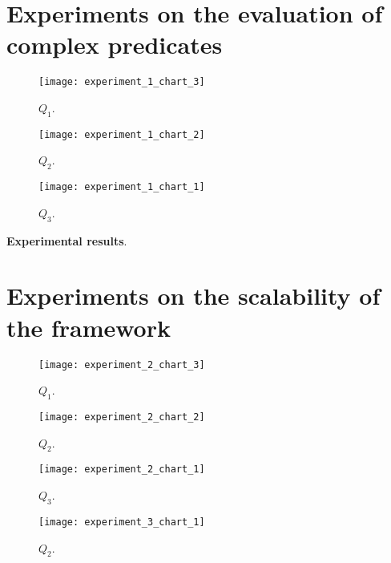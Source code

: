

\section{Experiments on the evaluation of complex predicates}\label{sec:predicates}


\begin{figure}[H]
  \centering
  \texttt{[image: experiment\_1\_chart\_3]}
  \caption{$Q_{1}$.}
  \label{fig:???}
\end{figure}

\begin{figure}[H]
  \centering
  \texttt{[image: experiment\_1\_chart\_2]}
  \caption{$Q_{2}$.}
  \label{fig:???}
\end{figure}

\begin{figure}[H]
  \centering
  \texttt{[image: experiment\_1\_chart\_1]}
  \caption{$Q_{3}$.}
  \label{fig:???}
\end{figure}


\textbf{Experimental results}.

\section{Experiments on the scalability of the framework}\label{sec:scalability}

\begin{figure}[H]
  \centering
  \texttt{[image: experiment\_2\_chart\_3]}
  \caption{$Q_{1}$.}
  \label{fig:???}
\end{figure}

\begin{figure}[H]
  \centering
  \texttt{[image: experiment\_2\_chart\_2]}
  \caption{$Q_{2}$.}
  \label{fig:???}
\end{figure}

\begin{figure}[H]
  \centering
  \texttt{[image: experiment\_2\_chart\_1]}
  \caption{$Q_{3}$.}
  \label{fig:???}
\end{figure}



\begin{figure}[H]
  \centering
  \texttt{[image: experiment\_3\_chart\_1]}
  \caption{$Q_{2}$.}
  \label{fig:???}
\end{figure}

